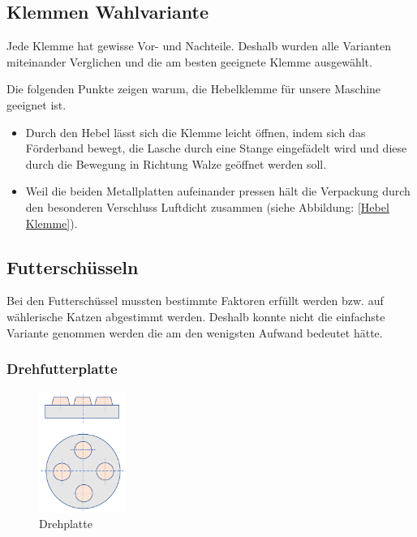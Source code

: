 \subsection{Klemmen Wahlvariante}

Jede Klemme hat gewisse Vor- und Nachteile. Deshalb wurden alle Varianten miteinander Verglichen und die am besten geeignete Klemme ausgewählt.

Die folgenden Punkte zeigen warum, die Hebelklemme für unsere Maschine geeignet ist.

\begin{itemize}
\item Durch den Hebel lässt sich die Klemme leicht öffnen, indem sich das Förderband bewegt, die Lasche durch eine Stange eingefädelt wird und diese durch die Bewegung in Richtung Walze geöffnet werden soll.
\item Weil die beiden Metallplatten aufeinander pressen hält die Verpackung durch den besonderen Verschluss Luftdicht zusammen (siehe Abbildung: \ref{Hebel Klemme}). 

\end{itemize} 

\subsection{Futterschüsseln}

Bei den Futterschüssel mussten bestimmte Faktoren erfüllt werden bzw. auf wählerische Katzen abgestimmt werden. Deshalb konnte nicht die einfachste Variante genommen werden die am  den wenigsten Aufwand bedeutet hätte. 

\subsubsection{Drehfutterplatte}

\begin{figure}
\vspace{-40pt}
  \begin{center}
    \includegraphics[width=0.25\textwidth]{Bilder/Powerpoint/Drehplatte}
  \end{center}
  \caption{Drehplatte}
  \label{Drehplatte}
  \vspace{-20pt}
\end{figure}

